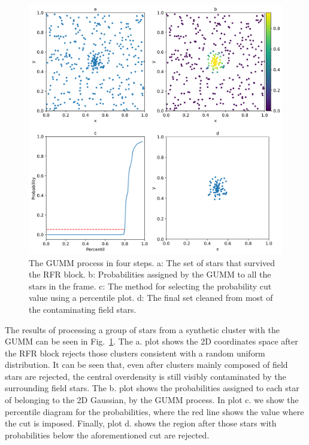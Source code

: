\documentclass[draft]{aa}
\begin{document}
 \begin{figure}
 \includegraphics[width=\hsize]{figs/GUMM.png}
 \caption{The GUMM process in four steps. a: The set of stars that survived
 the RFR block. b: Probabilities assigned by the GUMM to all the stars in the
 frame. c: The method for selecting the probability cut value using a
 percentile plot. d: The final set cleaned from most of the contaminating
 field stars.}
 \label{fig:gumm}
 \end{figure}

 The results of processing a group of stars from a synthetic cluster with the
 GUMM can be seen in Fig.~\ref{fig:gumm}.
 The a. plot shows the 2D coordinates space after the RFR
 block rejects those clusters consistent with a random uniform distribution.
 It can be seen that, even after clusters mainly composed of field stars are
 rejected, the central overdensity is still visibly contaminated by the
 surrounding field stars. The b. plot shows the probabilities assigned to each
 star of belonging to the 2D Gaussian, by the GUMM process. In plot c. we show
 the percentile diagram for the probabilities, where the red line shows the
 value where the cut is imposed. Finally, plot d. shows the region after those
 stars with probabilities below the aforementioned cut are rejected.\\
\end{document}
